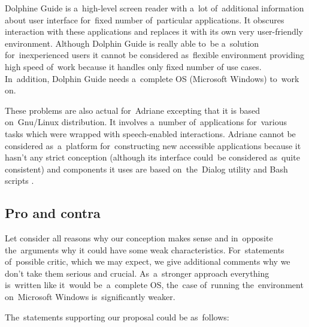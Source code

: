 \documentclass{acm_proc_article-sp}
\begin{document}
Dolphine Guide is a~high-level screen reader with a~lot of~additional information about user interface 
for~fixed number of~particular applications.
It obscures interaction with these applications and replaces it with its own 
very user-friendly environment.
Although Dolphin Guide is really able to~be a~solution for~inexperienced users 
it cannot be considered as~flexible environment providing high speed of~work 
because it handles only fixed number of use cases.
In~addition, Dolphin Guide needs a~complete OS (Microsoft Windows) to~work on.

These problems are also actual for~Adriane excepting 
that it is based on~Gnu/Linux distribution.
It involves a~number of~applications for~various tasks 
which were wrapped with speech-enabled interactions.
Adriane cannot be considered as~a~platform for~constructing new accessible applications 
because it hasn't any strict conception (although its interface could~be considered as~quite consistent)
and components it uses are based on~the~Dialog \cite{dialog} utility and Bash scripts \cite{bash}.

\subsection{Pro and contra}

Let consider all reasons why our conception makes sense and in~opposite the~arguments why  it could have some weak characteristics.
For~statements of~possible critic, which we may expect, 
we give additional comments why we don't take them serious and crucial. 
As~a~stronger approach everything is~written 
like it~would be~a~complete OS,
the~case of~running the~environment on~Microsoft Windows 
is~significantly weaker. 

The~statements supporting  our proposal  could be as~follows: 
\end{document}
